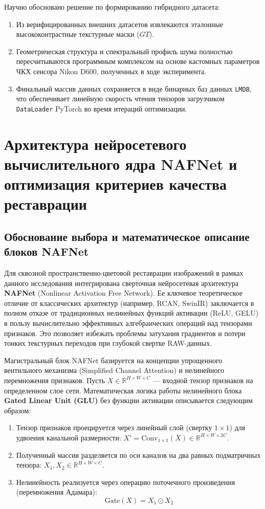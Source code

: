 \documentclass[12pt,a4paper]{article}
\begin{document}
Научно обосновано решение по формированию гибридного датасета:
\begin{enumerate}
    \item Из верифицированных внешних датасетов извлекаются эталонные высококонтрастные текстурные маски ($GT$).
    \item Геометрическая структура и спектральный профиль шума полностью пересчитываются программным комплексом на основе кастомных параметров ЧКХ сенсора Nikon D600, полученных в ходе эксперимента.
    \item Финальный массив данных сохраняется в виде бинарных баз данных \texttt{LMDB}, что обеспечивает линейную скорость чтения тензоров загрузчиком \texttt{DataLoader} PyTorch во время итераций оптимизации.
\end{enumerate}

\section{Архитектура нейросетевого вычислительного ядра NAFNet и оптимизация критериев качества реставрации}

\subsection{Обоснование выбора и математическое описание блоков NAFNet}
Для сквозной пространственно-цветовой реставрации изображений в рамках данного исследования интегрирована сверточная нейросетевая архитектура \textbf{NAFNet} (Nonlinear Activation Free Network). Ее ключевое теоретическое отличие от классических архитектур (например, RCAN, SwinIR) заключается в полном отказе от традиционных нелинейных функций активации (ReLU, GELU) в пользу вычислительно эффективных алгебраических операций над тензорами признаков. Это позволяет избежать проблемы затухания градиентов и потери тонких текстурных переходов при глубокой свертке RAW-данных.

Магистральный блок NAFNet базируется на концепции упрощенного вентильного механизма (Simplified Channel Attention) и нелинейного перемножения признаков. Пусть $X \in \mathbb{R}^{H \times W \times C}$ --- входной тензор признаков на определенном слое сети. Математическая логика работы нелинейного блока \textbf{Gated Linear Unit (GLU)} без функции активации описывается следующим образом:
\begin{enumerate}
    \item Тензор признаков проецируется через линейный слой (свертку $1 \times 1$) для удвоения канальной размерности: $X' = \text{Conv}_{1\times1}(X) \in \mathbb{R}^{H \times W \times 2C}$.
    \item Полученный массив разделяется по оси каналов на два равных подматричных тензора: $X_1, X_2 \in \mathbb{R}^{H \times W \times C}$.
    \item Нелинейность реализуется через операцию поточечного произведения (перемножения Адамара):
    \begin{equation}
        \text{Gate}(X) = X_1 \odot X_2
    \end{equation}
\end{enumerate}
\end{document}
